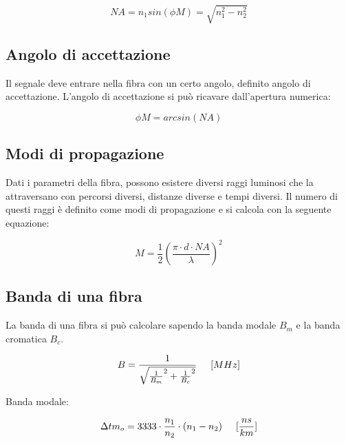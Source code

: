 \documentclass{article}
\begin{document}
    \begin{equation}
        NA = n_1 sin(\phi M) = \sqrt{n_1^2 - n_2^2}
    \end{equation}

    \subsection{Angolo di accettazione}

    Il segnale deve entrare nella fibra con un certo angolo, definito angolo di accettazione. L'angolo di accettazione si
    può ricavare dall'apertura numerica:

    \begin{equation}
        \phi M = arcsin(NA)
    \end{equation}

    \subsection{Modi di propagazione}

    Dati i parametri della fibra, possono esistere diversi raggi luminosi che la attraversano con percorsi diversi, distanze diverse
    e tempi diversi. Il numero di questi raggi è definito come modi di propagazione e si calcola con la seguente equazione:

    \begin{equation}
        M = \frac{1}{2} (\frac{\pi \cdot d \cdot NA}{\lambda})^2
    \end{equation}

    \subsection{Banda di una fibra}

    La banda di una fibra si può calcolare sapendo la banda modale $B_m$ e la banda cromatica $B_c$.

    \begin{equation}
        B = \frac{1}{
            \sqrt{
                \frac{1}{B_m}^2 +
                \frac{1}{B_c}^2
            }
        } \hspace{0.5cm} [MHz]
    \end{equation}

    Banda modale:

    \begin{equation}
        \Delta tm_o = 3333 \cdot \frac{n_1}{n_2} \cdot (n_1 - n_2) \hspace{0.5cm} [\frac{ns}{km}]
    \end{equation}
\end{document}
